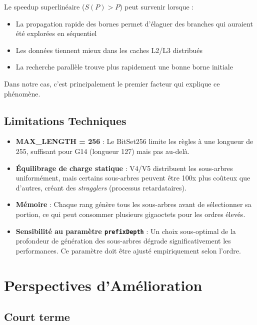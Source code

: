 \documentclass[12pt,a4paper,twoside]{report}
\begin{document}
\begin{tcolorbox}[colback=yellow!5, colframe=yellow!50!black, title=\textbf{Speedup Superlinéaire}]
Le speedup superlinéaire ($S(P) > P$) peut survenir lorsque :
\begin{itemize}
    \item La propagation rapide des bornes permet d'élaguer des branches qui auraient été explorées en séquentiel
    \item Les données tiennent mieux dans les caches L2/L3 distribués
    \item La recherche parallèle trouve plus rapidement une bonne borne initiale
\end{itemize}
Dans notre cas, c'est principalement le premier facteur qui explique ce phénomène.
\end{tcolorbox}

\subsection{Limitations Techniques}

\begin{itemize}
    \item \textbf{MAX\_LENGTH = 256} : Le BitSet256 limite les règles à une longueur de 255, suffisant pour G14 (longueur 127) mais pas au-delà.

    \item \textbf{Équilibrage de charge statique} : V4/V5 distribuent les sous-arbres uniformément, mais certains sous-arbres peuvent être 100x plus coûteux que d'autres, créant des \textit{stragglers} (processus retardataires).

    \item \textbf{Mémoire} : Chaque rang génère tous les sous-arbres avant de sélectionner sa portion, ce qui peut consommer plusieurs gigaoctets pour les ordres élevés.

    \item \textbf{Sensibilité au paramètre \texttt{prefixDepth}} : Un choix sous-optimal de la profondeur de génération des sous-arbres dégrade significativement les performances. Ce paramètre doit être ajusté empiriquement selon l'ordre.
\end{itemize}

\section{Perspectives d'Amélioration}

\subsection{Court terme}
\end{document}
